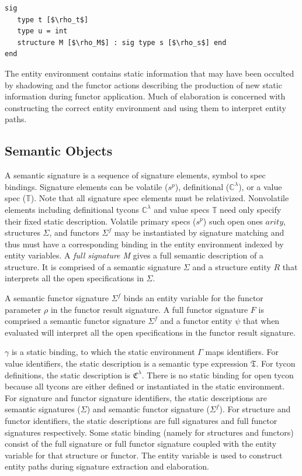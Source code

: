 \documentclass[9pt,nocopyrightspace, fleqn]{sigplanconf}
\begin{document}
\begin{lstlisting}
sig
   type t [$\rho_t$] 
   type u = int 
   structure M [$\rho_M$] : sig type s [$\rho_s$] end
end
\end{lstlisting}
 
The entity environment contains static information that may have been occulted by shadowing and the functor actions describing the production of new static information during functor application. Much of elaboration is concerned with constructing the correct entity environment and using them to interpret entity paths. 

\subsection{Semantic Objects}
A semantic signature is a sequence of signature elements, symbol to spec bindings. Signature elements can be volatile ($s^p$), definitional ($\mathbb{C}^\lambda$), or a value spec ($\mathbb{T}$). Note that all signature spec elements must be relativized. Nonvolatile elements including definitional tycons $\mathbb{C}^\lambda$ and value specs $\mathbb{T}$ need only specify their fixed static description. Volatile primary specs ($s^p$) such open ones $arity$, structures $\Sigma$, and functors $\Sigma^f$ may be instantiated by signature matching and thus must have a corresponding binding in the entity environment indexed by entity variables. A \emph{full signature M} gives a full semantic description of a structure. It is comprised of a semantic signature $\Sigma$ and a structure entity $R$ that interprets all the open specifications in $\Sigma$. 

A semantic functor signature $\Sigma^f$ binds an entity variable for the functor parameter $\rho$ in the functor result signature. A full functor signature $F$ is comprised a semantic functor signature $\Sigma^f$ and a functor entity $\psi$ that when evaluated will interpret all the open specifications in the functor result signature. 

$\gamma$ is a static binding, to which the static environment $\Gamma$ maps identifiers. For value identifiers, the static description is a semantic type expression $\mathfrak{T}$. For tycon definitions, the static description is $\mathfrak{C}^\lambda$. There is no static binding for open tycon because all tycons are either defined or instantiated in the static environment.  For signature and functor signature identifiers, the static descriptions are semantic signatures ($\Sigma$) and semantic functor signature ($\Sigma^f$). For structure and functor identifiers, the static descriptions are full signatures and full functor signatures respectively. Some static binding (namely for structures and functors) consist of the full signature or full functor signature coupled with the entity variable for that structure or functor. The entity variable is used to construct entity paths during signature extraction and elaboration. 
\end{document}
